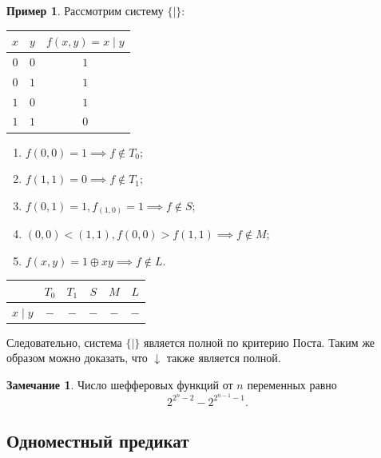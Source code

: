 \documentclass[a5paper, 11pt]{extarticle}
\theoremstyle{definition}
\newtheorem{example}{Пример}[subsection]
\theoremstyle{definition}
\theoremstyle{definition}
\newtheorem*{note*}{Замечание}
\numberwithin{figure}{section}
\numberwithin{table}{section}
\begin{document}
\begin{example}
    Рассмотрим систему \(\{\mid\}\):
    {
    \renewcommand*{\arraystretch}{1.5}
    \begin{longtable}{|c|c|c|}
        \hline
        \(x\) & \(y\) & \(f(x, y) = x \mid y\) \\
        \hline
        \(0\) & \(0\) & \(1\)                  \\
        \hline
        \(0\) & \(1\) & \(1\)                  \\
        \hline
        \(1\) & \(0\) & \(1\)                  \\
        \hline
        \(1\) & \(1\) & \(0\)                  \\
        \hline
    \end{longtable}
    }

    \begin{enumerate}
        \item \(f(0, 0) = 1 \implies f \notin T_0\);
        \item \(f(1, 1) = 0 \implies f \notin T_1\);
        \item \(f(0, 1) = 1, f_(1, 0) = 1 \implies f \notin S\);
        \item \((0, 0) < (1, 1), f(0, 0) > f(1, 1) \implies f \notin M\);
        \item \(f(x, y) = 1 \oplus xy \implies f \notin L\).
    \end{enumerate}

    {
    \renewcommand*{\arraystretch}{1.5}
    \begin{longtable}{|c|c|c|c|c|c|}
        \hline
                     & \(T_0\) & \(T_1\) & \(S\) & \(M\) & \(L\) \\
        \hline
        \(x \mid y\) & \(-\)   & \(-\)   & \(-\) & \(-\) & \(-\) \\
        \hline
    \end{longtable}
    }

    Следовательно, система \(\{|\}\) является полной по критерию Поста. Таким же образом можно доказать, что \({\downarrow}\) также является полной.
\end{example}

\begin{note*}
    Число шефферовых функций от \(n\) переменных равно
    \[
        2^{2^n - 2} - 2^{2^{n - 1} - 1}.
    \]
\end{note*}

\subsection{Одноместный предикат}
\end{document}
